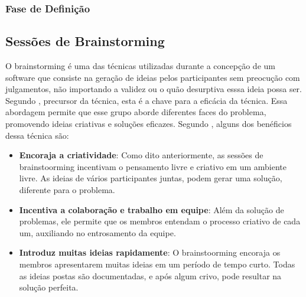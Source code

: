 

\subsubsection{Fase de Definição}


\subsection{Sessões de Brainstorming}

O brainstorming é uma das técnicas utilizadas durante a concepção de um software que consiste na geração de ideias pelos participantes sem preocução com julgamentos, não importando a validez ou o quão desurptiva esssa ideia possa ser. Segundo \cite{osborn1953}, precursor da técnica, esta é a chave para a eficácia da técnica. 
Essa abordagem permite que esse grupo aborde diferentes faces do problema, promovendo ideias criativas e soluções eficazes. Segundo \cite{miro2025}, alguns dos benéficios dessa técnica são:

\begin{itemize}
    \item \textbf{Encoraja a criatividade}: Como dito anteriormente, as sessões de brainstoorming incentivam o pensamento livre e criativo em um ambiente livre. As ideias de vários participantes juntas, podem gerar uma solução, diferente para o problema.
    \item \textbf{Incentiva a colaboração e trabalho em equipe}: Além da solução de problemas, ele permite que os membros entendam o processo criativo de cada um, auxiliando no entrosamento da equipe.
    \item \textbf{Introduz muitas ideias rapidamente}: O brainstoorming encoraja os membros apresentarem muitas ideias em um período de tempo curto. Todas as ideias postas são documentadas, e após algum crivo, pode resultar na solução perfeita.
\end{itemize}

